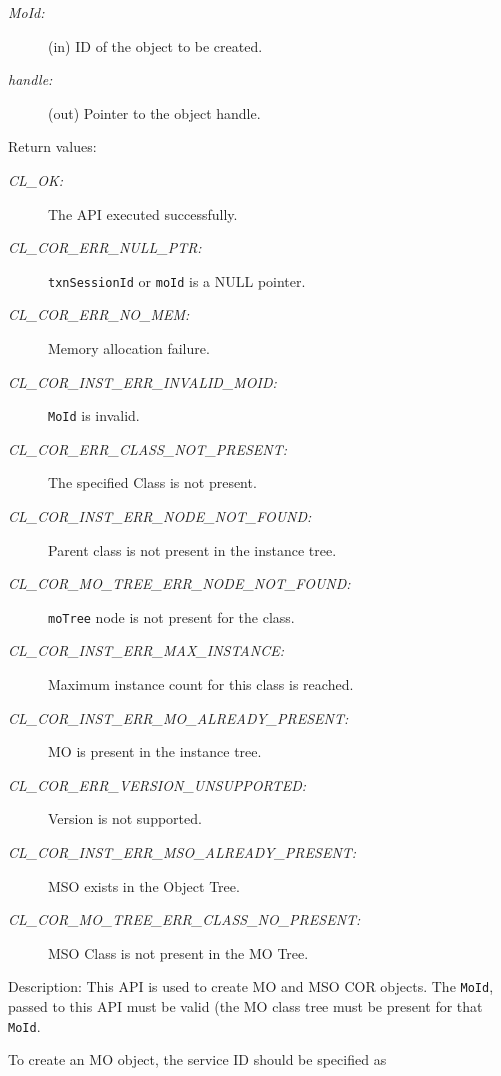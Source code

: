 \begin{flushleft}
\begin{Desc}
\begin{description}
\item[{\em MoId:}](in) ID of the object to be created. 
\item[{\em handle:}](out) Pointer to the object handle.
\end{description}
\end{Desc}
\begin{Desc}
\item[Return values:]
\begin{description}
\item[{\em CL\_\-OK:}]The API executed successfully. 
\item[{\em CL\_\-COR\_\-ERR\_\-NULL\_\-PTR:}]{\tt{txnSessionId}} or {\tt{moId}} is a NULL pointer. 
\item[{\em CL\_\-COR\_\-ERR\_\-NO\_\-MEM:}]Memory allocation failure. 
\item[{\em CL\_\-COR\_\-INST\_\-ERR\_\-INVALID\_\-MOID:}]{\tt{{\tt{MoId}}}} is invalid.
\item[{\em CL\_\-COR\_\-ERR\_\-CLASS\_\-NOT\_\-PRESENT:}] The specified Class is not present. 
\item[{\em CL\_\-COR\_\-INST\_\-ERR\_\-NODE\_\-NOT\_\-FOUND:}] Parent class is not present in the instance tree. 
\item[{\em CL\_\-COR\_\-MO\_\-TREE\_\-ERR\_\-NODE\_\-NOT\_\-FOUND:}]{\tt{mo\-Tree}} node is not present for the class. 
\item[{\em CL\_\-COR\_\-INST\_\-ERR\_\-MAX\_\-INSTANCE:}]Maximum instance count for this class is reached. 
\item[{\em CL\_\-COR\_\-INST\_\-ERR\_\-MO\_\-ALREADY\_\-PRESENT:}]MO is present in the instance tree. 
\item[{\em CL\_\-COR\_\-ERR\_\-VERSION\_\-UNSUPPORTED:}]Version is not supported. 
\item[{\em CL\_\-COR\_\-INST\_\-ERR\_\-MSO\_\-ALREADY\_\-PRESENT:}] MSO exists in the Object Tree. 
\item[{\em CL\_\-COR\_\-MO\_\-TREE\_\-ERR\_\-CLASS\_\-NO\_\-PRESENT:}]MSO Class is not present in the MO Tree.\end{description}
\end{Desc}
\begin{Desc}
\item[Description:]This API is used to create MO and MSO COR objects. The {\tt{{\tt{MoId}}}}, passed to this
API must be valid (the MO class tree must be present for that {\tt{{\tt{MoId}}}}. 
\par 
To create an MO object, the service ID should be specified as 

\end{Desc}
\end{flushleft}
